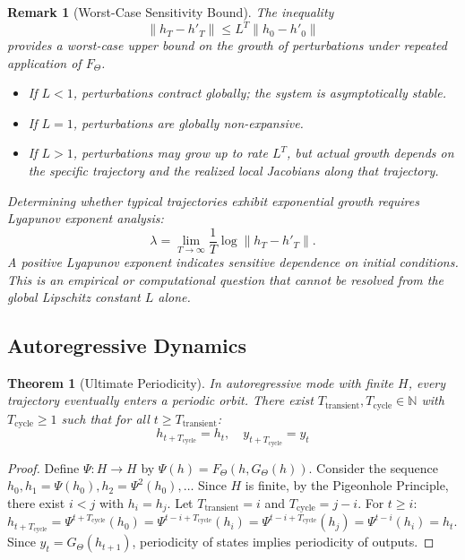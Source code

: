 \documentclass[11pt,a4paper]{article}
\newtheorem{theorem}{Theorem}[section]
\newtheorem*{remark}{Remark}
\begin{document}
\begin{remark}[Worst-Case Sensitivity Bound]
\label{rem:sensitivity}
The inequality
\[
\|h_T - h'_T\| \leq L^T \|h_0 - h'_0\|
\]
provides a \emph{worst-case upper bound} on the growth of perturbations under repeated application of $F_\Theta$.

\begin{itemize}
    \item If $L < 1$, perturbations contract globally; the system is asymptotically stable.
    \item If $L = 1$, perturbations are globally non-expansive.
    \item If $L > 1$, perturbations \emph{may} grow up to rate $L^T$, but actual growth depends on the specific trajectory and the realized local Jacobians along that trajectory.
\end{itemize}

Determining whether typical trajectories exhibit exponential growth requires Lyapunov exponent analysis:
\[
\lambda = \lim_{T \to \infty} \frac{1}{T} \log \|h_T - h'_T\|.
\]
A positive Lyapunov exponent indicates sensitive dependence on initial conditions. This is an empirical or computational question that cannot be resolved from the global Lipschitz constant $L$ alone.
\end{remark}

\subsection{Autoregressive Dynamics}

\begin{theorem}[Ultimate Periodicity]
\label{thm:periodicity}
In autoregressive mode with finite $H$, every trajectory eventually enters a periodic orbit. There exist $T_{\text{transient}}, T_{\text{cycle}} \in \mathbb{N}$ with $T_{\text{cycle}} \geq 1$ such that for all $t \geq T_{\text{transient}}$:
\begin{equation}
h_{t+T_{\text{cycle}}} = h_t, \quad y_{t+T_{\text{cycle}}} = y_t
\end{equation}
\end{theorem}

\begin{proof}
Define $\Psi: H \to H$ by $\Psi(h) = F_\Theta(h, G_\Theta(h))$. Consider the sequence $h_0, h_1 = \Psi(h_0), h_2 = \Psi^2(h_0), \ldots$ Since $H$ is finite, by the Pigeonhole Principle, there exist $i < j$ with $h_i = h_j$. Let $T_{\text{transient}} = i$ and $T_{\text{cycle}} = j - i$. For $t \geq i$: $h_{t+T_{\text{cycle}}} = \Psi^{t+T_{\text{cycle}}}(h_0) = \Psi^{t-i+T_{\text{cycle}}}(h_i) = \Psi^{t-i+T_{\text{cycle}}}(h_j) = \Psi^{t-i}(h_i) = h_t$. Since $y_t = G_\Theta(h_{t+1})$, periodicity of states implies periodicity of outputs.
\end{proof}
\end{document}
